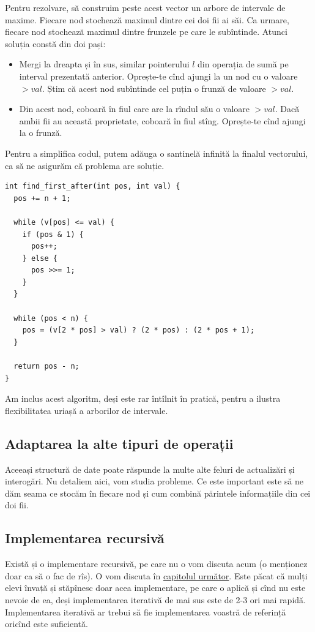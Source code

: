 \documentclass[../main.tex]{subfiles}
\begin{document}
Pentru rezolvare, să construim peste acest vector un arbore de intervale de maxime. Fiecare nod stochează maximul dintre cei doi fii ai săi. Ca urmare, fiecare nod stochează maximul dintre frunzele pe care le subîntinde. Atunci soluția constă din doi pași:

\begin{itemize}
  \item Mergi la dreapta și în sus, similar pointerului $l$ din operația de sumă pe interval prezentată anterior. Oprește-te cînd ajungi la un nod cu o valoare $> val$. Știm că acest nod subîntinde cel puțin o frunză de valoare $> val$.
  \item Din acest nod, coboară în fiul care are la rîndul său o valoare $> val$. Dacă ambii fii au această proprietate, coboară în fiul stîng. Oprește-te cînd ajungi la o frunză.
\end{itemize}

Pentru a simplifica codul, putem adăuga o santinelă infinită la finalul vectorului, ca să ne asigurăm că problema are soluție.

\begin{verbatim}
int find_first_after(int pos, int val) {
  pos += n + 1;

  while (v[pos] <= val) {
    if (pos & 1) {
      pos++;
    } else {
      pos >>= 1;
    }
  }

  while (pos < n) {
    pos = (v[2 * pos] > val) ? (2 * pos) : (2 * pos + 1);
  }

  return pos - n;
}
\end{verbatim}

Am inclus acest algoritm, deși este rar întîlnit în pratică, pentru a ilustra flexibilitatea uriașă a arborilor de intervale.

\subsection{Adaptarea la alte tipuri de operații}

Aceeași structură de date poate răspunde la multe alte feluri de actualizări și interogări. Nu detaliem aici, vom studia probleme. Ce este important este să ne dăm seama ce stocăm în fiecare nod și cum combină părintele informațiile din cei doi fii.

\subsection{Implementarea recursivă}

Există și o implementare recursivă, pe care nu o vom discuta acum (o menționez doar ca să o fac de rîs). O vom discuta în \hyperref[chapter:segment-trees-lazy]{capitolul următor}. Este păcat că mulți elevi învață și stăpînesc doar acea implementare, pe care o aplică și cînd nu este nevoie de ea, deși implementarea iterativă de mai sus este de 2-3 ori mai rapidă. Implementarea iterativă ar trebui să fie implementarea voastră de referință oricînd este suficientă.
\end{document}
